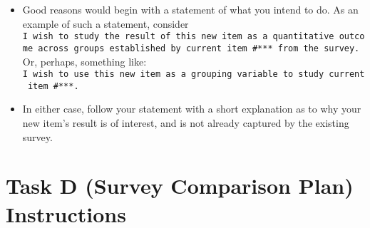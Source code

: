 \documentclass[]{book}
\providecommand{\tightlist}{%
  \setlength{\itemsep}{0pt}\setlength{\parskip}{0pt}}
\theoremstyle{definition}
\theoremstyle{definition}
\theoremstyle{definition}
\theoremstyle{remark}
\begin{document}
\begin{enumerate}
\begin{itemize}
\begin{enumerate}
      \begin{itemize}
      \tightlist
      \item
        Good reasons would begin with a statement of what you intend to
        do. As an example of such a statement, consider
        \texttt{I\ wish\ to\ study\ the\ result\ of\ this\ new\ item\ as\ a\ quantitative\ outcome\ across\ groups\ established\ by\ current\ item\ \#***\ from\ the\ survey.}
        Or, perhaps, something like:
        \texttt{I\ wish\ to\ use\ this\ new\ item\ as\ a\ grouping\ variable\ to\ study\ current\ item\ \#***.}
      \item
        In either case, follow your statement with a short explanation
        as to why your new item's result is of interest, and is not
        already captured by the existing survey.
      \end{itemize}
    \end{enumerate}
  \end{itemize}
\end{enumerate}

\hypertarget{task-d-survey-comparison-plan-instructions}{%
\chapter{Task D (Survey Comparison Plan)
Instructions}\label{task-d-survey-comparison-plan-instructions}}
\end{document}
